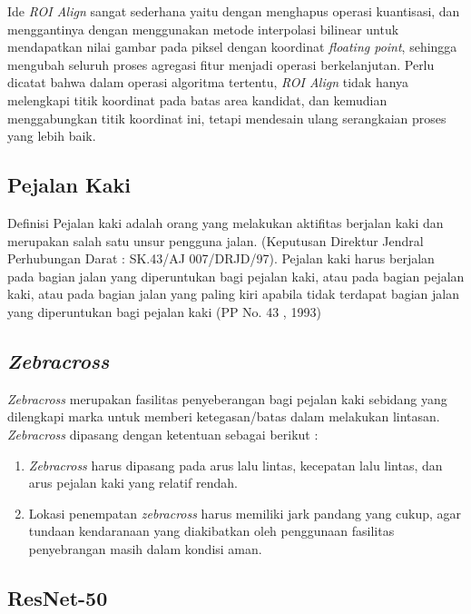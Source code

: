 Ide \textit{ROI Align} sangat sederhana yaitu dengan menghapus operasi kuantisasi, dan menggantinya dengan menggunakan metode interpolasi bilinear untuk mendapatkan nilai gambar pada piksel dengan koordinat \textit{floating point}, sehingga mengubah seluruh proses agregasi fitur menjadi operasi berkelanjutan. Perlu dicatat bahwa dalam operasi algoritma tertentu, \textit{ROI Align} tidak hanya melengkapi titik koordinat pada batas area kandidat, dan kemudian menggabungkan titik koordinat ini, tetapi mendesain ulang serangkaian proses yang lebih baik.

\subsection{Pejalan Kaki}
\label{subsec:pedestrian}

Definisi Pejalan kaki adalah orang yang melakukan aktifitas berjalan kaki dan merupakan salah satu unsur pengguna jalan. (Keputusan Direktur Jendral Perhubungan Darat : SK.43/AJ 007/DRJD/97). Pejalan kaki harus berjalan pada bagian jalan yang diperuntukan bagi pejalan kaki, atau pada bagian pejalan kaki, atau pada bagian jalan yang paling kiri apabila tidak terdapat bagian jalan yang diperuntukan bagi pejalan kaki (PP No. 43 , 1993)


\subsection{\textit{Zebracross}}
\label{subsec:zebracross}

\textit{Zebracross} merupakan  fasilitas penyeberangan bagi pejalan kaki sebidang yang dilengkapi marka untuk memberi ketegasan/batas dalam melakukan lintasan. \textit{Zebracross} dipasang dengan ketentuan sebagai berikut :
\begin{enumerate}[nolistsep]
	\item \textit{Zebracross} harus dipasang pada arus lalu lintas, kecepatan lalu lintas, dan arus pejalan kaki yang relatif rendah.
	\item Lokasi penempatan \textit{zebracross} harus memiliki jark pandang yang cukup, agar tundaan kendaranaan yang diakibatkan oleh penggunaan fasilitas penyebrangan masih dalam kondisi aman. 
\end{enumerate}

\subsection{ResNet-50}
\label{subsec:resnet50-definition}

